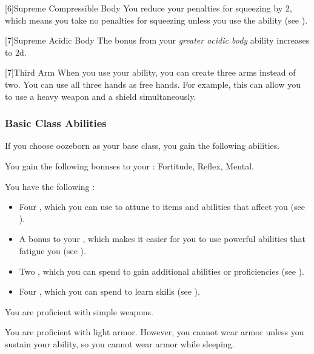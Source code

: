             [6]{Supreme Compressible Body} You reduce your penalties for squeezing by 2, which means you take no penalties for squeezing unless you use the  ability (see ).

            [7]{Supreme Acidic Body} The bonus from your \textit{greater acidic body} ability increases to \plus2d.

            [7]{Third Arm} When you use your  ability, you can create three arms instead of two.
            You can use all three hands as free hands.
            For example, this can allow you to use a heavy weapon and a shield simultaneously.

        \subsubsection{Basic Class Abilities}
            If you choose oozeborn as your base class, you gain the following abilities.

            You gain the following bonuses to your :  Fortitude,  Reflex,  Mental.

             You have the following :
            \begin{itemize}
                \item Four , which you can use to attune to items and abilities that affect you (see ).
                \item A  bonus to your , which makes it easier for you to use powerful abilities that fatigue you (see ).
                \item Two , which you can spend to gain additional abilities or proficiencies (see ).
                \item Four , which you can spend to learn skills (see ).
            \end{itemize}

            You are proficient with simple weapons.

            You are proficient with light armor.
            However, you cannot wear armor unless you sustain your  ability, so you cannot wear armor while sleeping.


